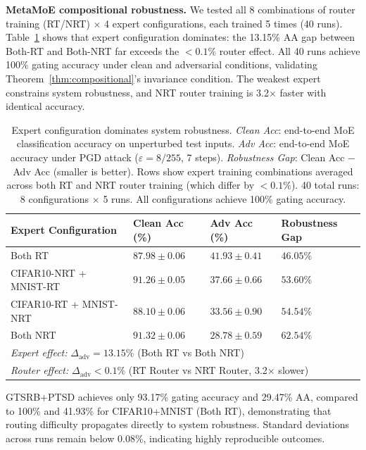 \documentclass[runningheads]{llncs}
\begin{document}
\textbf{\textsf{MetaMoE} compositional robustness.}
We tested all 8 combinations of router training (RT/NRT) $\times$ 4 expert configurations, each trained 5 times (40 runs). Table~\ref{tab:expert-impact} shows that expert configuration dominates: the 13.15\% AA gap between Both-RT and Both-NRT far exceeds the $< 0.1\%$ router effect. All 40 runs achieve 100\% gating accuracy under clean and adversarial conditions, validating Theorem~\ref{thm:compositional}'s invariance condition. The weakest expert constrains system robustness, and NRT router training is 3.2$\times$ faster with identical accuracy.

\begin{table}[t]
\centering
\caption{Expert configuration dominates system robustness. \emph{Clean Acc}: end-to-end MoE classification accuracy on unperturbed test inputs. \emph{Adv Acc}: end-to-end MoE accuracy under PGD attack ($\varepsilon = 8/255$, 7 steps). \emph{Robustness Gap}: Clean Acc $-$ Adv Acc (smaller is better). Rows show expert training combinations averaged across both RT and NRT router training (which differ by $< 0.1\%$). 40 total runs: 8 configurations $\times$ 5 runs. All configurations achieve 100\% gating accuracy.}
\label{tab:expert-impact}
\small
\begin{tabular}{llll}
\toprule
\textbf{Expert Configuration} & \textbf{Clean Acc (\%)} & \textbf{Adv Acc (\%)} & \textbf{Robustness Gap} \\
\midrule
Both RT & $87.98 \pm 0.06$ & $41.93 \pm 0.41$ & $46.05\%$ \\
CIFAR10-NRT + MNIST-RT & $91.26 \pm 0.05$ & $37.66 \pm 0.66$ & $53.60\%$ \\
CIFAR10-RT + MNIST-NRT & $88.10 \pm 0.06$ & $33.56 \pm 0.90$ & $54.54\%$ \\
Both NRT & $91.32 \pm 0.06$ & $28.78 \pm 0.59$ & $62.54\%$ \\
\midrule
\multicolumn{4}{l}{\textit{Expert effect:} $\Delta_{\text{adv}} = 13.15\%$ (Both RT vs Both NRT)} \\
\multicolumn{4}{l}{\textit{Router effect:} $\Delta_{\text{adv}} < 0.1\%$ (RT Router vs NRT Router, 3.2$\times$ slower)} \\
\bottomrule
\end{tabular}
\end{table}

GTSRB+PTSD achieves only 93.17\% gating accuracy and 29.47\% AA, compared to 100\% and 41.93\% for CIFAR10+MNIST (Both RT), demonstrating that routing difficulty propagates directly to system robustness. Standard deviations across runs remain below 0.08\%, indicating highly reproducible outcomes.
\end{document}
